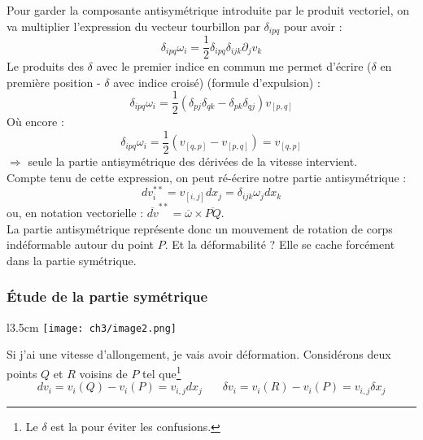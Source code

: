          Pour garder la composante antisymétrique introduite par le produit vectoriel, on va
         multiplier l'expression du vecteur tourbillon par $\delta_{ipq}$ pour avoir :
         \begin{equation}
         \delta_{ipq}\omega_i = \frac{1}{2}\delta_{ipq}\delta_{ijk}\partial_jv_k
         \end{equation}
         Le produits des $\delta$ avec le premier indice en commun me permet d'écrire ($\delta$
         en première position - $\delta$ avec indice croisé) (formule d'expulsion) :
         \begin{equation}
         \delta_{ipq}\omega_i = \frac{1}{2}(\delta_{pj}\delta_{qk} - \delta_{pk}\delta_{qj})
         v_{[p,q]}
         \end{equation}
         Où encore : 
         \begin{equation}
         \delta_{ipq}\omega_i = \frac{1}{2}(v_{[q,p]}-v_{[p,q]}) = v_{[q,p]}
         \end{equation}
         $\Rightarrow$ seule la partie antisymétrique des dérivées de la vitesse intervient.\\
         
         Compte tenu de cette expression, on peut ré-écrire notre partie antisymétrique :
         \begin{equation}
         dv_i^{**} = v_{[i,j]}dx_j = \delta_{ijk}\omega_jdx_k
         \end{equation}
         ou, en notation vectorielle : $\overline{dv}^{**} = \overline{\omega}\times
         \overline{PQ}$.\\
         La partie antisymétrique représente donc un mouvement de rotation de corps indéformable
         autour du point $P$. Et la déformabilité ? Elle se cache forcément dans la partie
         symétrique.
         
         
         
         
         
         \subsubsection{Étude de la partie symétrique}
         \begin{wrapfigure}[7]{l}{3.5cm}
        \texttt{[image: ch3/image2.png]}
        \end{wrapfigure}
         Si j'ai une vitesse d'allongement, je vais avoir déformation.  Considérons deux points
         $Q$ et $R$ voisins de $P$ tel que\footnote{Le $\delta$ est la pour éviter les confusions.}
         \begin{equation}
         dv_i = v_i(Q) - v_i(P) = v_{i,j} dx_j\ \ \ \ \ \ \ \ \delta v_i = v_i(R) - v_i(P) =
         v_{i,j}\delta x_j
         \end{equation}
         
